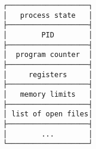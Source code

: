 \documentclass[varwidth,crop]{standalone}
\begin{document}
\begin{verbatim}
┌───────────────────┐
│   process state   │
├───────────────────┤
│        PID        │
├───────────────────┤
│  program counter  │
├───────────────────┤
│     registers     │
├───────────────────┤
│   memory limits   │
├───────────────────┤
│ list of open files│
├───────────────────┤
│        ...        │
└───────────────────┘
\end{verbatim}
\end{document}
